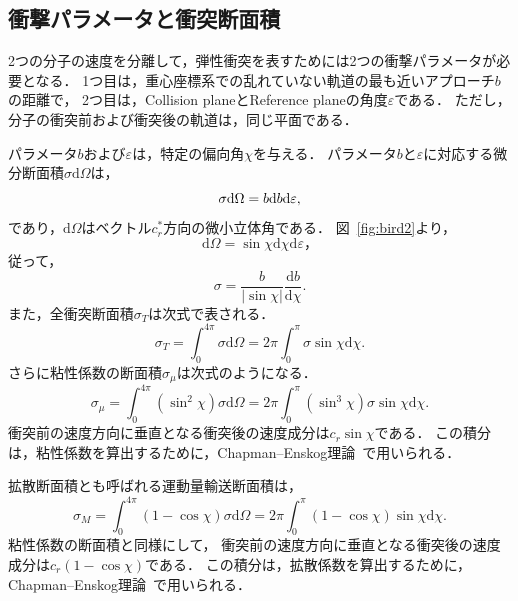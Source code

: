 \subsection{衝撃パラメータと衝突断面積}
2つの分子の速度を分離して，弾性衝突を表すためには2つの衝撃パラメータが必要となる．
1つ目は，重心座標系での乱れていない軌道の最も近いアプローチ$b$の距離で，
2つ目は，Collision planeとReference planeの角度$\varepsilon$である．
ただし，分子の衝突前および衝突後の軌道は，同じ平面である．

パラメータ$b$および$\varepsilon$は，特定の偏向角$\chi$を与える．
パラメータ$b$と$\varepsilon$に対応する微分断面積$\sigma \mathrm{d}\Omega$は，
\begin{equation}
    \sigma \mathrm{d}\Omega = b{\rm d}b\mathrm{d}\varepsilon,
\end{equation}
であり，$\mathrm{d}\Omega$はベクトル$c_r^*$方向の微小立体角である．
図~\ref{fig:bird2}より，
\begin{equation}
    \mathrm{d}\Omega = \sin \chi\mathrm{d}\chi\mathrm{d}\varepsilon，
\end{equation}
従って，
\begin{equation}
    \sigma = \dfrac{b}{|\sin\chi|}\dfrac{\mathrm{d}b}{\mathrm{d}\chi}.
\end{equation}
また，全衝突断面積$\sigma_T$は次式で表される．
\begin{equation}
    \sigma_T = \int_0^{4\pi}\sigma\mathrm{d}\Omega = 2\pi\int_0^\pi \sigma\sin\chi\mathrm{d}\chi.
\end{equation}
さらに粘性係数の断面積$\sigma_\mu$は次式のようになる．
\begin{equation}
    \sigma_\mu = \int_0^{4\pi}\left( \sin^2 \chi \right)\sigma\mathrm{d}\Omega 
    = 2\pi\int_0^\pi \left(\sin^3 \chi\right)\sigma\sin \chi\mathrm{d}\chi.
\end{equation}
衝突前の速度方向に垂直となる衝突後の速度成分は$c_r\sin \chi$である．
この積分は，粘性係数を算出するために，Chapman–Enskog理論~\cite{bird1994molecular}で用いられる．

拡散断面積とも呼ばれる運動量輸送断面積は，
\begin{equation}
    \sigma_M = \int_0^{4\pi}\left(1 - \cos \chi\right)\sigma\mathrm{d}\Omega 
    = 2\pi\int_0^\pi \left(1-\cos \chi\right)\sin \chi\mathrm{d}\chi.
\end{equation}
粘性係数の断面積と同様にして，
衝突前の速度方向に垂直となる衝突後の速度成分は$c_r\left(1 - \cos \chi\right)$である．
この積分は，拡散係数を算出するために，Chapman–Enskog理論~\cite{bird1994molecular}で用いられる．

